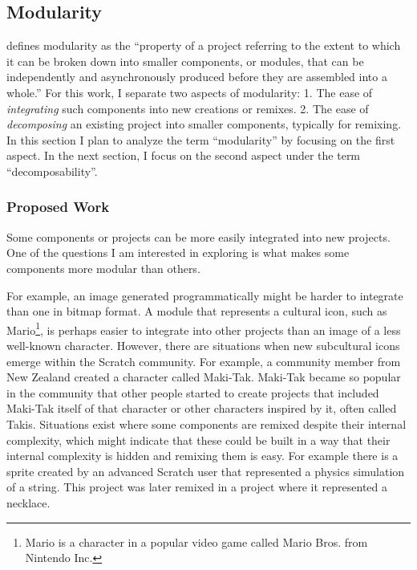 \subsection{Modularity}
\citet{benkler_coases_2002} defines modularity as the ``property of a project referring to the extent to which it can be broken down into smaller components, or modules, that can be independently and asynchronously produced before they are assembled into a whole.''
For this work, I separate two aspects of modularity:
1. The ease of \emph{integrating} such components into new creations or remixes.
2. The ease of \emph{decomposing} an existing project into smaller components, typically for remixing.
In this section I plan to analyze the term ``modularity'' by focusing on the first aspect.
In the next section, I focus on the second aspect under the term ``decomposability''.

\subsubsection{Proposed Work}
Some components or projects can be more easily integrated into new projects. 
One of the questions I am interested in exploring is what makes some components more modular than others.

For example, an image generated programmatically might be harder to integrate than one in bitmap format. 
A module that represents a cultural icon, such as Mario\footnote{Mario is a character in a popular video game called Mario Bros. from Nintendo Inc.}, is perhaps easier to integrate into other projects than an image of a less well-known character.
However, there are situations when new subcultural icons emerge within the Scratch community.
For example, a community member from New Zealand created a character called Maki-Tak. 
Maki-Tak became so popular in the community that other people started to create projects that included Maki-Tak itself of  that character or other characters inspired by it, often called Takis.
Situations exist where some components are remixed despite their internal complexity, which might indicate that these could be built in a way that their internal complexity is hidden and remixing them is easy. 
For example there is a sprite created by an advanced Scratch user that represented a physics simulation of a string. 
This project was later remixed in a project where it represented a necklace.

